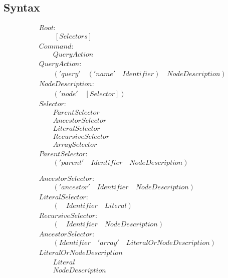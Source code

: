 \documentclass[12pt, a4papaer, AutoFakeBold, AutoFakeSlant]{article}
\begin{document}
\subsection*{Syntax}
\begin{align*}
& Root:\\
& \quad\quad \ [Selectors] \\
& Command: \\
& \quad \quad  QueryAction \\ 
& QueryAction: \\
& \quad\quad  (  'query' \quad ('name' \quad Identifier ) \quad NodeDescription ) \\
& NodeDescription: \\
& \quad \quad ( 'node' \quad [Selector] ) \\
& Selector: \\
& \quad\quad  ParentSelector \\
& \quad\quad  AncestorSelector \\
& \quad\quad  LiteralSelector \\
& \quad\quad  RecursiveSelector \\
& \quad\quad  ArraySelector \\
& ParentSelector: \\
& \quad\quad  (  'parent' \quad Identifier \quad NodeDescription ) \\
\\
\\
& AncestorSelector: \\
& \quad\quad  (  'ancestor' \quad Identifier \quad NodeDescription ) \\
& LiteralSelector: \\
& \quad\quad  (  \quad Identifier \quad Literal ) \\
& RecursiveSelector: \\
& \quad\quad  (  \quad Identifier \quad NodeDescription ) \\
& AncestorSelector: \\
& \quad\quad  (  Identifier \quad 'array' \quad LiteralOrNodeDescription ) \\
& LiteralOrNodeDescription \\
& \quad\quad Literal \\
& \quad\quad NodeDescription \\
\end{align*}
\end{document}
